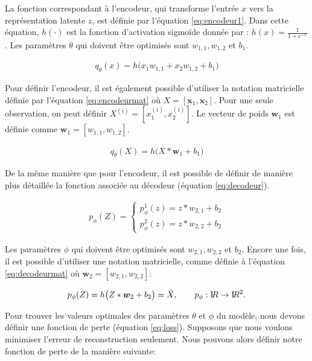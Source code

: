 La fonction correspondant à l'encodeur, qui transforme l'entrée $x$ vers la représentation latente $z$, est définie par l'équation \ref{eq:encodeur1}. Dans cette équation, $h(\cdot)$ est la fonction d'activation sigmoïde donnée par : $h(x)=\frac{1}{1+e^{-x}}$. Les paramètres $\theta$ qui doivent être optimisés sont $w_{1,1}, w_{1,2}$ et $b_1$. 

\begin{gather}  \label{eq:encodeur1}
q_{\theta}(x)=h\big(x_1w_{1,1} + x_2 w_{1,2} + b_1\big)
\end{gather}

Pour définir l'encodeur, il est également possible d'utiliser la notation matricielle définie par l'équation \ref{eq:encodeurmat} où $X = [\boldsymbol x_1, \boldsymbol x_2]$. Pour une seule observation, on peut définir $X^{(i)} = [x_{1}^{(i)}, x_{2}^{(i)}]$. Le vecteur de poids $\boldsymbol w_1$ est définie comme $\boldsymbol w_1 = [w_{1,1}, w_{1,2}]$.

\begin{gather}  \label{eq:encodeurmat}
q_{\theta}(X)=h\big(X*\boldsymbol w_1 + b_1\big)
\end{gather}

De la même manière que pour l'encodeur, il est possible de définir de manière plus détaillée la fonction associée au décodeur (équation \ref{eq:decodeur}).

\begin{gather}  \label{eq:decodeur}
p_{\phi}(Z)=
\begin{cases}
p_{\phi}^1(z) = z*w_{2,1}+b_2 \\
p_{\phi}^2(z) = z*w_{2,2}+b_2
\end{cases}
\end{gather}

Les paramètres $\phi$ qui doivent être optimisés sont $w_{2,1}, w_{2,2}$ et $b_2$. Encore une fois, il est possible d'utiliser une notation matricielle, comme définie à l'équation \ref{eq:decodeurmat} où $\boldsymbol w_2 = [w_{2,1}, w_{2,2}]$:

\begin{gather} \label{eq:decodeurmat}
p_{\phi}(Z)=h\big(Z*\boldsymbol w_2 + b_2\big)=\hat{X}, \qquad
p_{\phi}: \textrm I\!R \rightarrow \textrm I\!R^2.
\end{gather}

Pour trouver les valeurs optimales des paramètres $\theta$ et $\phi$ du modèle, nous devons définir une fonction de perte (équation \ref{eq:loss}). Supposons que nous voulons minimiser l'erreur de reconstruction seulement. Nous pouvons alors définir notre fonction de perte de la manière suivante:

